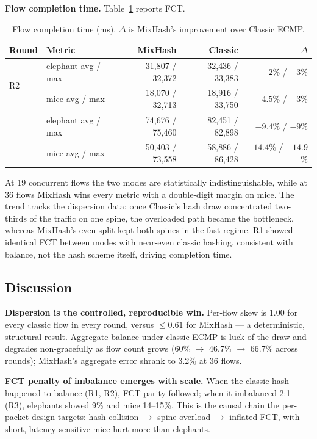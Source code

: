 \textbf{Flow completion time.} Table~\ref{tab:fct} reports FCT.

\begin{table}[t]
  \centering
  \caption{Flow completion time (ms). $\Delta$ is MixHash's improvement
    over Classic ECMP.}
  \label{tab:fct}
  \begin{tabular}{llrrr}
    \toprule
    Round & Metric & MixHash & Classic & $\Delta$ \\
    \midrule
    \multirow{2}{*}{R2}
      & elephant avg / max & 31{,}807 / 32{,}372 & 32{,}436 / 33{,}383 & $-2$\% / $-3$\% \\
      & mice avg / max      & 18{,}070 / 32{,}713 & 18{,}916 / 33{,}750 & $-4.5$\% / $-3$\% \\
    \addlinespace
    \multirow{2}{*}{R3}
      & elephant avg / max & 74{,}676 / 75{,}460 & 82{,}451 / 82{,}898 & $\mathbf{-9.4}$\% / $-9$\% \\
      & mice avg / max      & 50{,}403 / 73{,}558 & 58{,}886 / 86{,}428 & $\mathbf{-14.4}$\% / $\mathbf{-14.9}$\% \\
    \bottomrule
  \end{tabular}
\end{table}

At 19 concurrent flows the two modes are statistically indistinguishable,
while at 36 flows MixHash wins every metric with a double-digit margin on
mice. The trend tracks the dispersion data: once Classic's hash draw
concentrated two-thirds of the traffic on one spine, the overloaded path
became the bottleneck, whereas MixHash's even split kept both spines in
the fast regime. R1 showed identical FCT between modes with near-even
classic hashing, consistent with balance, not the hash scheme itself,
driving completion time.

\subsection{Discussion}
\label{sec:discussion}

\textbf{Dispersion is the controlled, reproducible win.} Per-flow skew is
1.00 for every classic flow in every round, versus $\le 0.61$ for MixHash
--- a deterministic, structural result. Aggregate balance under classic
ECMP is luck of the draw and degrades non-gracefully as flow count grows
(60\% $\rightarrow$ 46.7\% $\rightarrow$ 66.7\% across rounds);
MixHash's aggregate error shrank to 3.2\% at 36 flows.

\textbf{FCT penalty of imbalance emerges with scale.} When the classic
hash happened to balance (R1, R2), FCT parity followed; when it imbalanced
2:1 (R3), elephants slowed 9\% and mice 14--15\%. This is the causal chain
the per-packet design targets: hash collision $\rightarrow$ spine overload
$\rightarrow$ inflated FCT, with short, latency-sensitive mice hurt more
than elephants.

